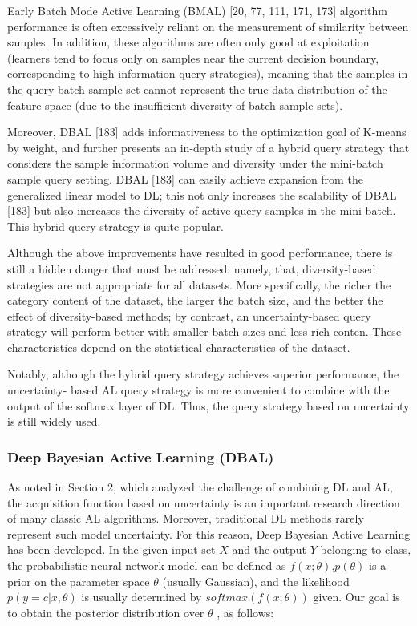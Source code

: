Early Batch Mode Active Learning (BMAL) [20, 77, 111, 171, 173] algorithm performance is often
excessively reliant on the measurement of similarity between samples. In addition, these algorithms
are often only good at exploitation (learners tend to focus only on samples near the current decision
boundary, corresponding to high-information query strategies), meaning that the samples in the
query batch sample set cannot represent the true data distribution of the feature space (due to the
insufficient diversity of batch sample sets).

Moreover, DBAL [183] adds informativeness to the optimization goal of K-means by weight, and
further presents an in-depth study of a hybrid query strategy that considers the sample information
volume and diversity under the mini-batch sample query setting. DBAL [183] can easily achieve
expansion from the generalized linear model to DL; this not only increases the scalability of DBAL
[183] but also increases the diversity of active query samples in the mini-batch. This hybrid query
strategy is quite popular. 

Although the above improvements have resulted in good performance, there is still a hidden
danger that must be addressed: namely, that, diversity-based strategies are not appropriate for
all datasets. More specifically, the richer the category content of the dataset, the larger the batch
size, and the better the effect of diversity-based methods; by contrast, an uncertainty-based query
strategy will perform better with smaller batch sizes and less rich conten. These characteristics
depend on the statistical characteristics of the dataset.

Notably, although the hybrid query strategy achieves superior performance, the uncertainty-
based AL query strategy is more convenient to combine with the output of the softmax layer of DL.
Thus, the query strategy based on uncertainty is still widely used.


\subsubsection{Deep Bayesian Active Learning (DBAL)}
As noted in Section 2, which analyzed the challenge
of combining DL and AL, the acquisition function based on uncertainty is an important research
direction of many classic AL algorithms. Moreover, traditional DL methods rarely represent such
model uncertainty.
For this reason, Deep Bayesian Active Learning has been developed. In the given input set $X$
and the output $Y$ belonging to class, the probabilistic neural network model can be defined as $f(x;\theta)$,$p(\theta)$ is a prior on the parameter space $\theta$ (usually Gaussian), and the likelihood $p(y = c |x, \theta)$ is usually determined by $softmax(f (x; \theta ))$ given. Our goal is to obtain the posterior distribution
over $\theta$ , as follows:


